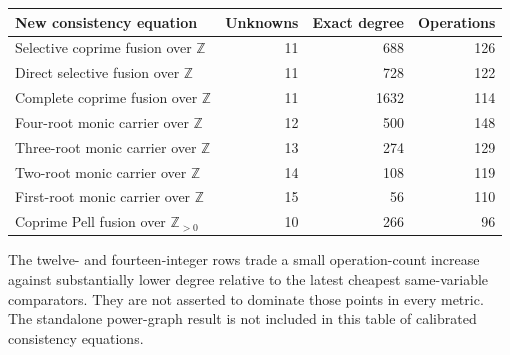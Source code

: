 \begin{center}
\begin{tabular}{lrrr}
\toprule
New consistency equation & Unknowns & Exact degree & Operations\\
\midrule
Selective coprime fusion over $\mathbb Z$ & 11 & 688 & 126\\
Direct selective fusion over $\mathbb Z$ & 11 & 728 & 122\\
Complete coprime fusion over $\mathbb Z$ & 11 & 1632 & 114\\
Four-root monic carrier over $\mathbb Z$ & 12 & 500 & 148\\
Three-root monic carrier over $\mathbb Z$ & 13 & 274 & 129\\
Two-root monic carrier over $\mathbb Z$ & 14 & 108 & 119\\
First-root monic carrier over $\mathbb Z$ & 15 & 56 & 110\\
Coprime Pell fusion over $\mathbb Z_{>0}$ & 10 & 266 & 96\\
\bottomrule
\end{tabular}
\end{center}
The twelve- and fourteen-integer rows trade a small operation-count increase
against substantially lower degree relative to the latest cheapest
same-variable comparators. They are not asserted to dominate those points
in every metric. The standalone power-graph result is not included in this
table of calibrated consistency equations.
